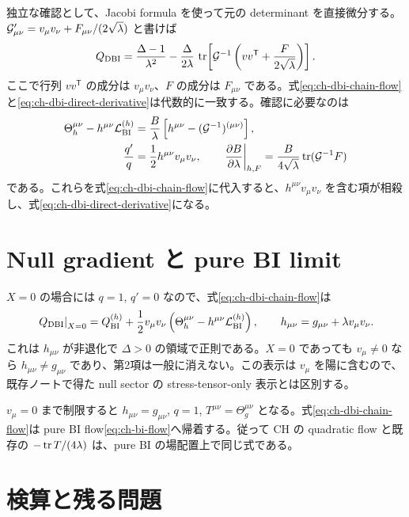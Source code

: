 独立な確認として、Jacobi formula を使って元の determinant を直接微分する。$\mathcal G_{\mu\nu}'=v_\mu v_\nu+F_{\mu\nu}/(2\sqrt\lambda)$ と書けば
\begin{equation}
 Q_{\mathrm{DBI}}
 =\frac{\Delta-1}{\lambda^2}
 -\frac{\Delta}{2\lambda}\,
 \operatorname{tr}\!\left[\mathcal G^{-1}
 \left(vv^{\mathsf T}+\frac{F}{2\sqrt\lambda}\right)\right].
 \label{eq:ch-dbi-direct-derivative}
\end{equation}
ここで行列 $vv^{\mathsf T}$ の成分は $v_\mu v_\nu$、$F$ の成分は $F_{\mu\nu}$ である。式\eqref{eq:ch-dbi-chain-flow}と\eqref{eq:ch-dbi-direct-derivative}は代数的に一致する。確認に必要なのは
\begin{align}
 \Theta_h^{\mu\nu}-h^{\mu\nu}\mathcal L_{\mathrm{BI}}^{(h)}
 &=\frac{B}{\lambda}\left[h^{\mu\nu}-(\mathcal G^{-1})^{(\mu\nu)}\right],
 \nonumber\\
 \frac{q'}q&=\frac12h^{\mu\nu}v_\mu v_\nu,\qquad
 \left.\frac{\partial B}{\partial\lambda}\right|_{h,F}
 =\frac{B}{4\sqrt\lambda}\operatorname{tr}(\mathcal G^{-1}F)
 \label{eq:ch-dbi-algebra-check}
\end{align}
である。これらを式\eqref{eq:ch-dbi-chain-flow}に代入すると、$h^{\mu\nu}v_\mu v_\nu$ を含む項が相殺し、式\eqref{eq:ch-dbi-direct-derivative}になる。

\section{Null gradient と pure BI limit}

$X=0$ の場合には $q=1$, $q'=0$ なので、式\eqref{eq:ch-dbi-chain-flow}は
\begin{equation}
 \left.Q_{\mathrm{DBI}}\right|_{X=0}
 =Q_{\mathrm{BI}}^{(h)}
 +\frac12v_\mu v_\nu
 \left(\Theta_h^{\mu\nu}-h^{\mu\nu}\mathcal L_{\mathrm{BI}}^{(h)}\right),
 \qquad h_{\mu\nu}=g_{\mu\nu}+\lambda v_\mu v_\nu.
 \label{eq:ch-dbi-null}
\end{equation}
これは $h_{\mu\nu}$ が非退化で $\Delta>0$ の領域で正則である。$X=0$ であっても $v_\mu\neq0$ なら $h_{\mu\nu}\neq g_{\mu\nu}$ であり、第2項は一般に消えない。この表示は $v_\mu$ を陽に含むので、既存ノートで得た null sector の stress-tensor-only 表示とは区別する。

$v_\mu=0$ まで制限すると $h_{\mu\nu}=g_{\mu\nu}$, $q=1$, $T^{\mu\nu}=\Theta_g^{\mu\nu}$ となる。式\eqref{eq:ch-dbi-chain-flow}は pure BI flow\eqref{eq:ch-bi-flow}へ帰着する。従って CH の quadratic flow と既存の $-\operatorname{tr} T/(4\lambda)$ は、pure BI の場配置上で同じ式である。

\section{検算と残る問題}

